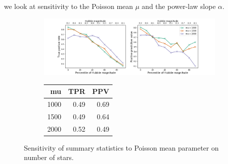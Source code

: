 we look at sensitivity to the Poisson mean $\mu$ and the power-law slope $\alpha$. 

\begin{figure}[ht]
\begin{subfigure}{\textwidth}
\centering
\includegraphics[width = \textwidth]{figures/prior_mu_sensitivty.png}
\end{subfigure}
\begin{subfigure}{\textwidth}
\begin{center}
\begin{tabular}{rrr}
\toprule
     mu &   TPR &   PPV \\
\midrule
 1000&  0.49 &  0.69 \\
 1500&  0.49 &  0.64 \\
 2000 &  0.52 &  0.49 \\
\bottomrule
\end{tabular}
\par\vspace{0pt}
\end{center}
\end{subfigure}\hfill
\caption{Sensitivity of summary statistics to Poisson mean parameter on number of stars. }
\end{figure}

